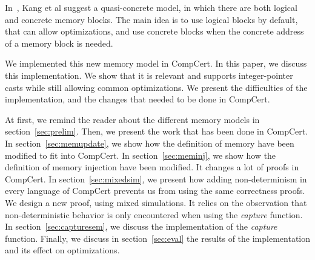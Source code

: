 In~\cite{DBLP:conf/pldi/KangHMGZV15}, Kang et al suggest a quasi-concrete model, in which there are both logical and concrete memory blocks. The main idea is to use logical blocks by default, that can allow optimizations, and use concrete blocks when the concrete address of a memory block is needed.

We implemented this new memory model in CompCert.
In this paper, we discuss this implementation.
We show that it is relevant and supports integer-pointer casts while still allowing common optimizations.
We present the difficulties of the implementation, and the changes that needed to be done in CompCert.

At first, we remind the reader about the different memory models in section~\ref{sec:prelim}.
Then, we present the work that has been done in CompCert.
In section~\ref{sec:memupdate}, we show how the definition of memory have been modified to fit into CompCert.
In section~\ref{sec:meminj}, we show how the definition of memory injection have been modified. It changes a lot of proofs in CompCert.
In section~\ref{sec:mixedsim}, we present how adding non-determinism in every language of CompCert prevents us from using the same correctness proofs. We design a new proof, using mixed simulations. It relies on the observation that non-deterministic behavior is only encountered when using the \textit{capture} function.
In section~\ref{sec:capturesem}, we discuss the implementation of the \textit{capture} function.
Finally, we discuss in section~\ref{sec:eval} the results of the implementation and its effect on optimizations. 
